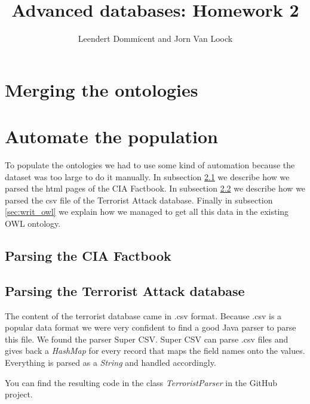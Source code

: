 \documentclass{article}
\title{Advanced databases: Homework 2}
\author{Leendert Dommicent and Jorn Van Loock}
\begin{document}
\maketitle
\section{Merging the ontologies}
\section{Automate the population}
To populate the ontologies we had to use some kind of automation because the dataset was too large to do it manually. In subsection \ref{sec:factbook} we describe how we parsed the html pages of the CIA Factbook. In subsection \ref{sec:terrorist_db} we describe how we parsed the csv file of the Terrorist Attack database. Finally in subsection \ref{sec:writ_owl} we explain how we managed to get all this data in the existing OWL ontology.
\subsection{Parsing the CIA Factbook}
\label{sec:factbook}
\subsection{Parsing the Terrorist Attack database}
\label{sec:terrorist_db}
The content of the terrorist database came in .csv format. Because .csv is a popular data format we were very confident to find a good Java parser to parse this file. We found the parser Super CSV\cite{supercsv}. Super CSV can parse .csv files and gives back a \textit{HashMap} for every record that maps the field names onto the values. Everything is parsed as a \textit{String} and handled accordingly.\par
You can find the resulting code in the class \textit{TerroristParser} in the GitHub project\cite{githubproject}.
\end{document}
